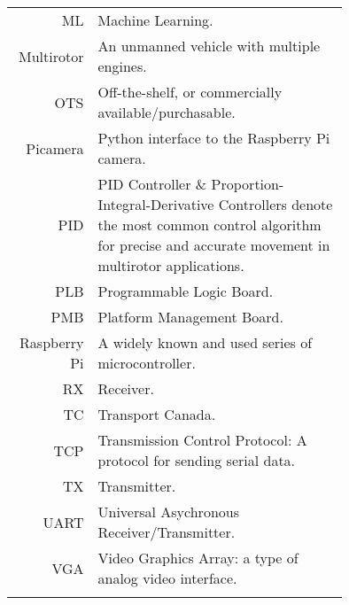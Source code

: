 \begin{tabular}[h]{rp{0.75\linewidth}}
    ML & Machine Learning.\\
    Multirotor & An unmanned vehicle with multiple engines. \\
    OTS & Off-the-shelf, or commercially available/purchasable. \\
    Picamera & Python interface to the Raspberry Pi camera. \\
    PID & PID Controller \& Proportion-Integral-Derivative Controllers denote the most common control algorithm for precise and accurate movement in multirotor applications.\\
    PLB & Programmable Logic Board. \\
    PMB & Platform Management Board. \\
    Raspberry Pi & A widely known and used series of microcontroller. \\
    RX & Receiver.\\
    TC & Transport Canada.\\
    TCP & Transmission Control Protocol: A protocol for sending serial data. \\
    TX & Transmitter.\\\
    UART & Universal Asychronous Receiver/Transmitter. \\
    VGA & Video Graphics Array: a type of analog video interface. \\
     & \\

    \hline

\end{tabular}
